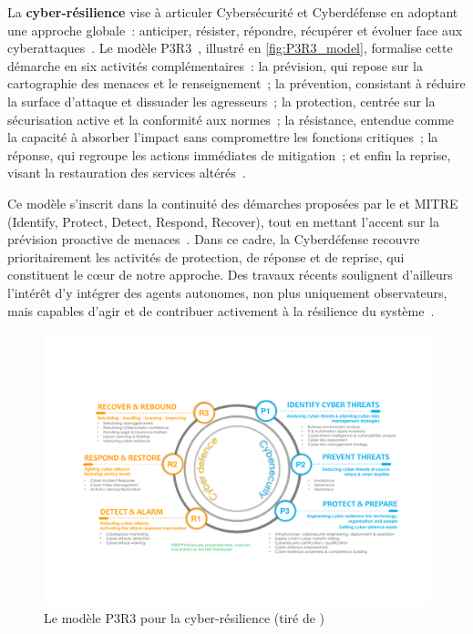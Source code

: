 La \textbf{cyber-résilience} vise à articuler Cybersécurité et Cyberdéfense en adoptant une approche globale~: anticiper, résister, répondre, récupérer et évoluer face aux cyberattaques~\cite{NISTresilience}. Le modèle P3R3~\cite{Theron2013P3R3}, illustré en \autoref{fig:P3R3_model}, formalise cette démarche en six activités complémentaires~: la prévision, qui repose sur la cartographie des menaces et le renseignement~; la prévention, consistant à réduire la surface d'attaque et dissuader les agresseurs~; la protection, centrée sur la sécurisation active et la conformité aux normes~; la résistance, entendue comme la capacité à absorber l'impact sans compromettre les fonctions critiques~; la réponse, qui regroupe les actions immédiates de mitigation~; et enfin la reprise, visant la restauration des services altérés~\cite{Theron2013P3R3}.

Ce modèle s'inscrit dans la continuité des démarches proposées par le  et MITRE (Identify, Protect, Detect, Respond, Recover), tout en mettant l'accent sur la prévision proactive de menaces~\cite{Theron2013P3R3}. Dans ce cadre, la Cyberdéfense recouvre prioritairement les activités de protection, de réponse et de reprise, qui constituent le cœur de notre approche. Des travaux récents soulignent d'ailleurs l'intérêt d'y intégrer des agents autonomes, non plus uniquement observateurs, mais capables d'agir et de contribuer activement à la résilience du système~\cite{Kott2023}.

\begin{figure}[h]
  \centering
  \includegraphics[width=\linewidth]{figures/P3R3.pdf}
  \caption{Le modèle P3R3 pour la cyber-résilience (tiré de \autocite{Kott2023})}
  \label{fig:P3R3_model}
\end{figure}


